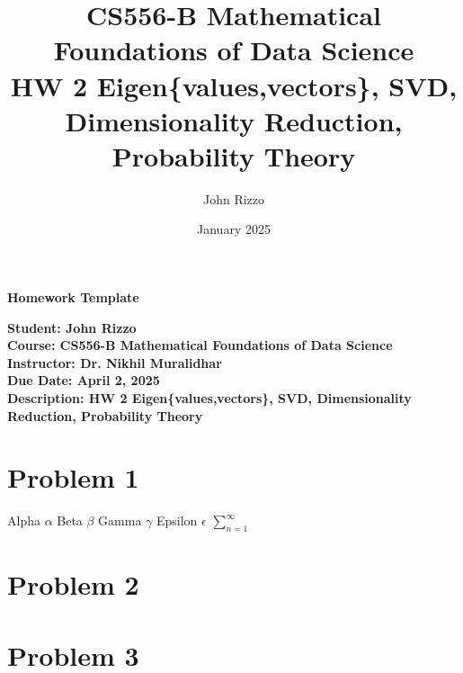 \documentclass[12pt, letterpaper]{article}
\title{CS556-B Mathematical Foundations of Data Science \\ HW 2 Eigen\{values,vectors\}, SVD, Dimensionality Reduction, Probability Theory}
\author{John Rizzo}
\date{January 2025}
\newcommand{\studentname}{John Rizzo}
\newcommand{\classname}{CS556-B Mathematical Foundations of Data Science}
\newcommand{\professorname}{Dr. Nikhil Muralidhar}
\newcommand{\assignmentdescription}{HW 2 Eigen\{values,vectors\}, SVD, Dimensionality Reduction, Probability Theory}
\newcommand{\duedate}{April 2, 2025}
\begin{document}
\begin{center}
    \Large \textbf{Homework Template} \\ [10pt]
\end{center}
\vspace{0.5cm}

\noindent
\normalsize \textbf{Student: \studentname} \\ [5pt]
\textbf{Course: \classname} \\ [5pt]
\textbf{Instructor: \professorname} \\ [5pt]
\textbf{Due Date: \duedate} \\ [5pt]
\textbf{Description: \assignmentdescription}

\vspace{0.5cm}

\section*{Problem 1}

Alpha $\alpha$
Beta $\beta$
Gamma $\gamma$
Epsilon $\epsilon$
$\sum_{n = 1}^{\infty}$

\vspace{1cm}

\section*{Problem 2}

\vspace{1cm}

\section*{Problem 3}

\vspace{1cm}

\end{document}
